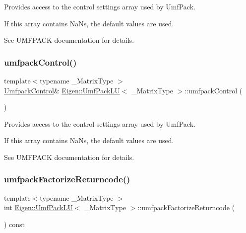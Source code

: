 Provides access to the control settings array used by Umf\+Pack.

If this array contains NaN\textquotesingle{}s, the default values are used.

See U\+M\+F\+P\+A\+CK documentation for details. \mbox{\label{class_eigen_1_1_umf_pack_l_u_a679bd267a0407d4ca985d97f0b864101}} 
\subsubsection{\texorpdfstring{umfpackControl()}{umfpackControl()}\hspace{0.1cm}{\footnotesize\ttfamily [2/2]}}
{\footnotesize\ttfamily template$<$typename \+\_\+\+Matrix\+Type $>$ \\
\mbox{\hyperlink{class_eigen_1_1_array}{Umfpack\+Control}}\& \mbox{\hyperlink{class_eigen_1_1_umf_pack_l_u}{Eigen\+::\+Umf\+Pack\+LU}}$<$ \+\_\+\+Matrix\+Type $>$\+::umfpack\+Control (\begin{DoxyParamCaption}{ }\end{DoxyParamCaption})\hspace{0.3cm}{\ttfamily [inline]}}

Provides access to the control settings array used by Umf\+Pack.

If this array contains NaN\textquotesingle{}s, the default values are used.

See U\+M\+F\+P\+A\+CK documentation for details. \mbox{\label{class_eigen_1_1_umf_pack_l_u_a822fa9d82754269c379dc4ce17920b0a}} 
\subsubsection{\texorpdfstring{umfpackFactorizeReturncode()}{umfpackFactorizeReturncode()}}
{\footnotesize\ttfamily template$<$typename \+\_\+\+Matrix\+Type $>$ \\
int \mbox{\hyperlink{class_eigen_1_1_umf_pack_l_u}{Eigen\+::\+Umf\+Pack\+LU}}$<$ \+\_\+\+Matrix\+Type $>$\+::umfpack\+Factorize\+Returncode (\begin{DoxyParamCaption}{ }\end{DoxyParamCaption}) const\hspace{0.3cm}{\ttfamily [inline]}}

